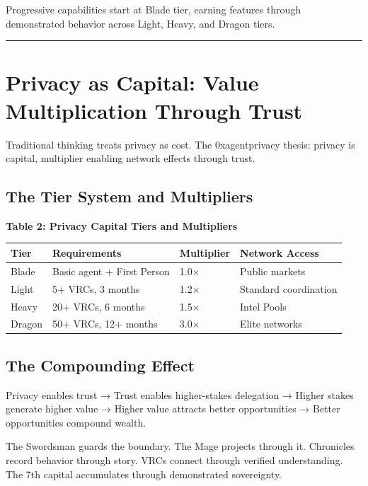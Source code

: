 \documentclass[
  11pt,
]{article}
\newcounter{none} %
\begin{document}
Progressive capabilities start at Blade tier, earning features through
demonstrated behavior across Light, Heavy, and Dragon tiers.

\begin{center}\rule{0.5\linewidth}{0.5pt}\end{center}

\section{Privacy as Capital: Value Multiplication Through
Trust}\label{privacy-as-capital-value-multiplication-through-trust}

Traditional thinking treats privacy as cost. The 0xagentprivacy thesis:
privacy is capital, multiplier enabling network effects through trust.

\subsection{The Tier System and
Multipliers}\label{the-tier-system-and-multipliers}

\textbf{Table 2: Privacy Capital Tiers and Multipliers}

{\def\LTcaptype{none} %
\begin{longtable}[]{@{}llll@{}}
\toprule\noalign{}
Tier & Requirements & Multiplier & Network Access \\
\midrule\noalign{}
\endhead
\bottomrule\noalign{}
\endlastfoot
Blade & Basic agent + First Person & 1.0× & Public markets \\
Light & 5+ VRCs, 3 months & 1.2× & Standard coordination \\
Heavy & 20+ VRCs, 6 months & 1.5× & Intel Pools \\
Dragon & 50+ VRCs, 12+ months & 3.0× & Elite networks \\
\end{longtable}
}

\subsection{The Compounding Effect}\label{the-compounding-effect}

Privacy enables trust → Trust enables higher-stakes delegation → Higher
stakes generate higher value → Higher value attracts better
opportunities → Better opportunities compound wealth.

The Swordsman guards the boundary. The Mage projects through it.
Chronicles record behavior through story. VRCs connect through verified
understanding. The 7th capital accumulates through demonstrated
sovereignty.
\end{document}
